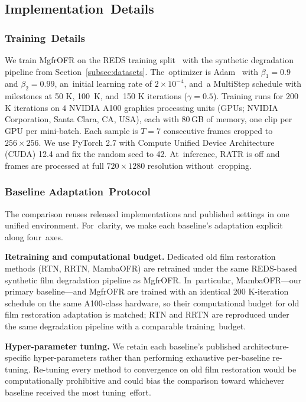 \documentclass[symmetry,article,accept,pdftex,moreauthors]{Definitions/mdpi}
\begin{document}
\subsection{Implementation~Details}
\label{subsec:implementation}
\unskip

\subsubsection{Training~Details}
\label{subsubsec:training_details}

We train MgfrOFR on the REDS training split~\cite{nah2019reds} with the synthetic degradation pipeline from Section~\ref{subsec:datasets}. The~optimizer is Adam~\cite{kingma2015adam} with $\beta_1=0.9$ and $\beta_2=0.99$, an~initial learning rate of $2\times10^{-4}$, and~a MultiStep schedule with milestones at 50 K, \mbox{100 K}, and~150 K iterations ($\gamma=0.5$). Training runs for $200$ K iterations on $4$ NVIDIA A100 graphics processing units (GPUs; NVIDIA Corporation, Santa Clara, CA, USA), each with 80\,GB of memory, one clip per GPU per mini-batch. Each sample is $T=7$ consecutive frames cropped to $256\times256$. We use PyTorch 2.7 with Compute Unified Device Architecture (CUDA) 12.4 and fix the random seed to 42. At~inference, RATR is off and frames are processed at full $720 \times 1280$ resolution without~cropping.

\subsubsection{Baseline Adaptation~Protocol}
\label{subsubsec:baseline_adaptation}

The comparison reuses released implementations and published settings in one unified environment. For~clarity, we make each baseline's adaptation explicit along four~axes.

\textbf{Retraining and computational budget.} Dedicated old film restoration methods (RTN, RRTN, MambaOFR) are retrained under the same REDS-based synthetic film degradation pipeline as MgfrOFR. In~particular, MambaOFR---our primary baseline---and MgfrOFR are trained with an identical 200 K-iteration schedule on the same A100-class hardware, so their computational budget for old film restoration adaptation is matched; RTN and RRTN are reproduced under the same degradation pipeline with a comparable training~budget.

\textbf{Hyper-parameter tuning.} We retain each baseline's published architecture-specific hyper-parameters rather than performing exhaustive per-baseline re-tuning. Re-tuning every method to convergence on old film restoration would be computationally prohibitive and could bias the comparison toward whichever baseline received the most tuning~effort.
\end{document}
